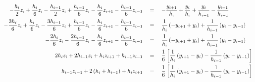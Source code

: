 \documentclass[letterpaper, 10pt, titlepage]{article}
\newcommand{\pp}{\paren}
\newcommand{\bb}{\brackets}
\begin{document}
\begin{equation}
    \begin{aligned}
        - \dfrac{h_{i}}{2}z_i
        + \dfrac{h_{i}}{6}z_i
        - \dfrac{h_{i-1}}{2}z_{i}
        + \dfrac{h_{i-1}}{6}z_{i}
        - \dfrac{h_{i}}{6}z_{i+1}
        - \dfrac{h_{i-1}}{6}z_{i-1}
        \quad&=\quad
        - \dfrac{y_{i+1}}{h_i}
        + \dfrac{y_i}{h_i}
        + \dfrac{y_{i}}{h_{i-1}}
        - \dfrac{y_{i-1}}{h_{i-1}}
        \\
        - \dfrac{3h_{i}}{6}z_i
        + \dfrac{h_{i}}{6}z_i
        - \dfrac{3h_{i-1}}{6}z_{i}
        + \dfrac{h_{i-1}}{6}z_{i}
        - \dfrac{h_{i}}{6}z_{i+1}
        - \dfrac{h_{i-1}}{6}z_{i-1}
        \quad&=\quad
        \dfrac{1}{h_i}\pp{
            - y_{i+1}
            + y_i
        }
        + \dfrac{1}{h_{i-1}}\pp{
            y_{i}
            - y_{i-1}
        }
        \\
        - \dfrac{2h_{i}}{6}z_i
        - \dfrac{2h_{i-1}}{6}z_{i}
        - \dfrac{h_{i}}{6}z_{i+1}
        - \dfrac{h_{i-1}}{6}z_{i-1}
        \quad&=\quad
        \dfrac{1}{h_i}\pp{
            - y_{i+1}
            + y_i
        }
        + \dfrac{1}{h_{i-1}}\pp{
            y_{i}
            - y_{i-1}
        }
        \\
        2h_{i}z_i
        + 2h_{i-1}z_{i}
        + h_{i}z_{i+1}
        + h_{i-1}z_{i-1}
        \quad&=\quad
        \dfrac{1}{6}\bb{
            \dfrac{1}{h_i}\pp{
                y_{i+1}
                - y_i
            }
            - \dfrac{1}{h_{i-1}}\pp{
                y_{i}
                - y_{i-1}
            }
        }
        \\
        h_{i-1}z_{i-1}
        + 2\pp{
            h_{i}
            + h_{i-1}
        }
        + h_{i}z_{i+1}
        \quad&=\quad
        \dfrac{1}{6}\bb{
            \dfrac{1}{h_i}\pp{
                y_{i+1}
                - y_i
            }
            - \dfrac{1}{h_{i-1}}\pp{
                y_{i}
                - y_{i-1}
            }
        }
    \end{aligned}
\end{equation}
\end{document}
